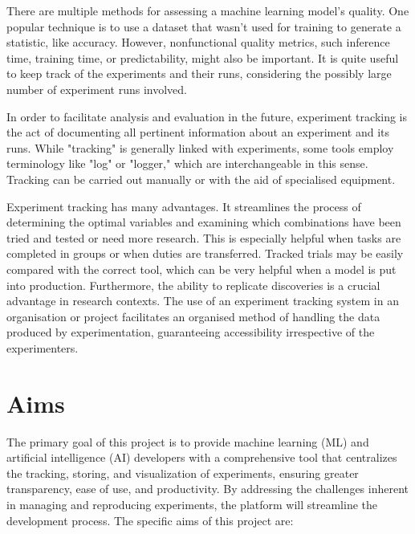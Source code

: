 \documentclass[12pt]{article}
\begin{document}
There are multiple methods for assessing a machine learning model's quality. One popular technique is to use a dataset that wasn't used for training to generate a statistic, like accuracy. However, nonfunctional quality metrics, such inference time, training time, or predictability, might also be important. It is quite useful to keep track of the experiments and their runs, considering the possibly large number of experiment runs involved.

In order to facilitate analysis and evaluation in the future, experiment tracking is the act of documenting all pertinent information about an experiment and its runs. While "tracking" is generally linked with experiments, some tools employ terminology like "log" or "logger," which are interchangeable in this sense. Tracking can be carried out manually or with the aid of specialised equipment.

Experiment tracking has many advantages. It streamlines the process of determining the optimal variables and examining which combinations have been tried and tested or need more research. This is especially helpful when tasks are completed in groups or when duties are transferred. Tracked trials may be easily compared with the correct tool, which can be very helpful when a model is put into production. Furthermore, the ability to replicate discoveries is a crucial advantage in research contexts. The use of an experiment tracking system in an organisation or project facilitates an organised method of handling the data produced by experimentation, guaranteeing accessibility irrespective of the experimenters.

\section{Aims}
The primary goal of this project is to provide machine learning (ML) and artificial intelligence (AI) developers with a comprehensive tool that centralizes the tracking, storing, and visualization of experiments, ensuring greater transparency, ease of use, and productivity. By addressing the challenges inherent in managing and reproducing experiments, the platform will streamline the development process. The specific aims of this project are:
\end{document}
